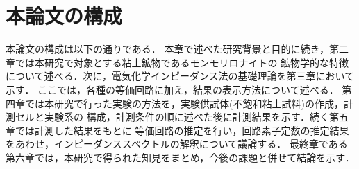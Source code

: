 \section{本論文の構成}
本論文の構成は以下の通りである．
本章で述べた研究背景と目的に続き，第二章では本研究で対象とする粘土鉱物であるモンモリロナイトの
鉱物学的な特徴について述べる．次に，電気化学インピーダンス法の基礎理論を第三章において示す．
ここでは，各種の等価回路に加え，結果の表示方法について述べる．
第四章では本研究で行った実験の方法を，実験供試体(不飽和粘土試料)の作成，計測セルと実験系の
構成，計測条件の順に述べた後に計測結果を示す．続く第五章では計測した結果をもとに
等価回路の推定を行い，回路素子定数の推定結果をあわせ，インピーダンススペクトルの解釈について議論する．
最終章である第六章では，本研究で得られた知見をまとめ，今後の課題と併せて結論を示す．


